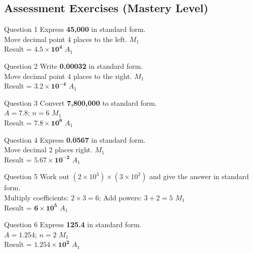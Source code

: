 \documentclass[12pt, a4paper, oneside]{article}
\begin{document}
\subsection*{Assessment Exercises (Mastery Level)}

\begin{solvingbox}{Question 1}
Express \textbf{45,000} in standard form. \\
Move decimal point 4 places to the left. \hfill $M_1$ \\
Result = $\mathbf{4.5 \times 10^4}$ \hfill $A_1$
\end{solvingbox}

\begin{solvingbox}{Question 2}
Write \textbf{0.00032} in standard form. \\
Move decimal point 4 places to the right. \hfill $M_1$ \\
Result = $\mathbf{3.2 \times 10^{-4}}$ \hfill $A_1$
\end{solvingbox}

\begin{solvingbox}{Question 3}
Convert \textbf{7,800,000} to standard form. \\
$A = 7.8$; $n = 6$ \hfill $M_1$ \\
Result = $\mathbf{7.8 \times 10^6}$ \hfill $A_1$
\end{solvingbox}

\begin{solvingbox}{Question 4}
Express \textbf{0.0567} in standard form. \\
Move decimal 2 places right. \hfill $M_1$ \\
Result = $\mathbf{5.67 \times 10^{-2}}$ \hfill $A_1$
\end{solvingbox}

\begin{solvingbox}{Question 5}
Work out \textbf{$(2 \times 10^3) \times (3 \times 10^2)$} and give the answer in standard form. \\
Multiply coefficients: $2 \times 3 = 6$; Add powers: $3 + 2 = 5$ \hfill $M_1$ \\
Result = $\mathbf{6 \times 10^5}$ \hfill $A_1$
\end{solvingbox}

\begin{solvingbox}{Question 6}
Express \textbf{125.4} in standard form. \\
$A = 1.254$; $n = 2$ \hfill $M_1$ \\
Result = $\mathbf{1.254 \times 10^2}$ \hfill $A_1$
\end{solvingbox}
\end{document}
